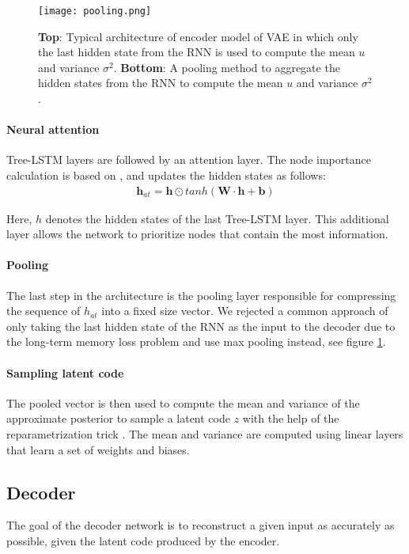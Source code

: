 \begin{figure}[ht!]
    \centering
    \texttt{[image: pooling.png]}
    \caption[RNN pooling]{\textbf{Top}: Typical architecture of encoder model of VAE in which only the last hidden state from the RNN is used to compute the mean $u$ and variance $\sigma^2$. \textbf{Bottom}: A pooling method to aggregate the hidden states from the RNN to compute the mean $u$ and variance $\sigma^2$.}
    \label{fig:pooling}
\end{figure}




\paragraph{Neural attention} Tree-LSTM layers are followed by an attention layer. 
The node importance calculation is based on \cite{winata2018attention}, and updates the hidden states as follows:
\begin{align}
    \mathbf{h}_{at} = \mathbf{h} \odot tanh(\mathbf{W} \cdot \mathbf{h} + \mathbf{b})
\end{align}

Here, $h$ denotes the hidden states of the last Tree-LSTM layer. This additional layer allows the network to prioritize nodes that contain the most information. 


\paragraph{Pooling} 
The last step in the architecture is the pooling layer responsible for compressing the sequence of $h_{at}$ into a fixed size vector. 
We rejected a common \cite{fabius2015variational} approach of only taking the last hidden state of the RNN as the input to the decoder due to the long-term memory loss problem \cite{kao2020comparison} and use max pooling instead, see figure \ref{fig:pooling}.



\paragraph{Sampling latent code} The pooled vector is then used to compute the mean and variance of the approximate posterior to sample a latent code $z$ with the help of the reparametrization trick \cite{kingma2013auto}. The mean and variance are computed using linear layers that learn a set of weights and biases. 


\newpage
\subsection{Decoder}
The goal of the decoder network is to reconstruct a given input as accurately as possible, given the latent code produced by the encoder. 

